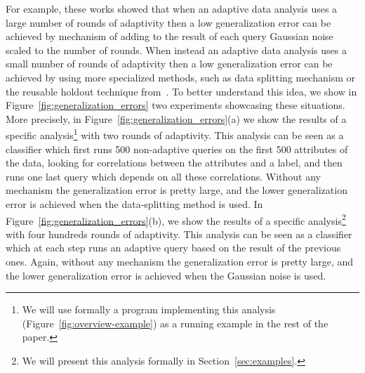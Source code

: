 For example, these works showed that when an adaptive data analysis uses a large number of rounds of adaptivity then a low generalization error can be achieved by mechanism of 
adding to the result of each query Gaussian noise scaled to the number of rounds. When instead  an adaptive data analysis uses a small number of rounds of adaptivity then a low generalization error can be achieved by using more specialized methods, such as data splitting mechanism or the reusable holdout technique from~\citet{DworkFHPRR15}.
To better understand this idea, we show in Figure~\ref{fig:generalization_errors} two experiments showcasing these situations. More precisely, in Figure~\ref{fig:generalization_errors}(a) we show the results of a specific analysis\footnote{We will use formally a program implementing this analysis (Figure~\ref{fig:overview-example}) as a running example in the rest of the paper.} with two rounds of adaptivity. This analysis can be seen as a classifier which first runs 500 non-adaptive queries on the first 500 attributes of the data, looking for correlations between the attributes and a label, and then runs one last query which depends on all these correlations. Without any mechanism the generalization error is pretty large, and the lower generalization error is achieved when the data-splitting method is used. 
In Figure~\ref{fig:generalization_errors}(b), we show the results of a specific analysis\footnote{We will present this analysis formally in Section~\ref{sec:examples}.} with four hundreds rounds of adaptivity. This analysis can be seen as a classifier which at each step runs an adaptive query based on the result of the previous ones. Again, without any mechanism the generalization error is pretty large, and the lower generalization error is achieved when the Gaussian noise is used. 


